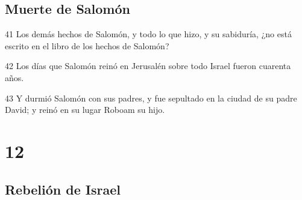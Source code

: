 \section*{Muerte de Salomón}

\par 41 Los demás hechos de Salomón, y todo lo que hizo, y su sabiduría, ¿no está escrito en el libro de los hechos de Salomón?
\par 42 Los días que Salomón reinó en Jerusalén sobre todo Israel fueron cuarenta años.
\par 43 Y durmió Salomón con sus padres, y fue sepultado en la ciudad de su padre David; y reinó en su lugar Roboam su hijo.

\chapter{12}

\section*{Rebelión de Israel}


